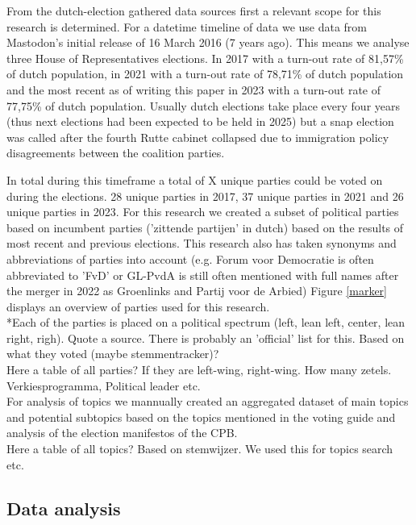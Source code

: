From the dutch-election gathered data sources first a relevant scope for this research is determined. For a datetime timeline of data we use data from Mastodon's initial release of 16 March 2016 (7 years ago). This means we analyse three House of Representatives elections. In 2017 with a turn-out rate of 81,57\% of dutch population, in 2021 with a turn-out rate of 78,71\% of dutch population and the most recent as of writing this paper in 2023 with a turn-out rate of 77,75\% of dutch population. Usually dutch elections take place every four years (thus next elections  had been expected to be held in 2025) but a snap election was called after the fourth Rutte cabinet collapsed due to immigration policy disagreements between the coalition parties.

In total during this timeframe a total of X unique parties could be voted on during the elections. 28 unique parties in 2017, 37 unique parties in 2021 and 26 unique parties in 2023. For this research we created a subset of political parties based on incumbent parties ('zittende partijen' in dutch) based on the results of most recent and previous elections. This research also has taken synonyms and abbreviations of parties into account (e.g. Forum voor Democratie is often abbreviated to 'FvD' or GL-PvdA is still often mentioned with full names after the merger in 2022 as Groenlinks and Partij voor de Arbied) Figure \ref{marker} displays an overview of parties used for this research. \\


*Each of the parties is placed on a political spectrum (left, lean left, center, lean right, righ). Quote a source. There is probably an 'official' list for this. Based on what they voted (maybe stemmentracker)? \\

Here a table of all parties? If they are left-wing, right-wing. How many zetels. Verkiesprogramma, Political leader etc. \\

For analysis of topics we mannually created an aggregated dataset of main topics and potential subtopics based on the topics mentioned in the voting guide and analysis of the election manifestos of the CPB. \\

Here a table of all topics? Based on stemwijzer. We used this for topics search etc.

\subsection{Data analysis}

